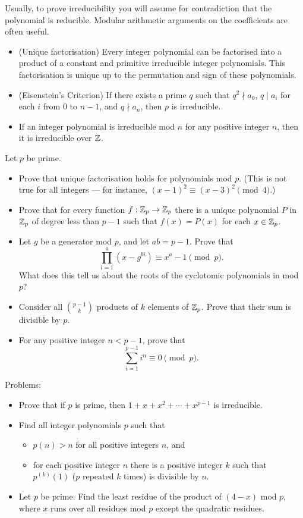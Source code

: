 Usually, to prove irreducibility you will assume for contradiction that the
polynomial is reducible. Modular arithmetic arguments on the coefficients are
often useful.
\begin{itemize}
  \item (Unique factorisation) Every integer polynomial can be factorised into a
    product of a constant and primitive irreducible integer
    polynomials. This factorisation is unique up to the permutation and sign of
    these polynomials.
  \item (Eisenstein's Criterion) If there exists a prime $q$ such that $q^2\nmid
    a_0$, $q\mid a_i$ for each $i$ from $0$ to $n-1$, and $q\nmid a_n$, then $p$
    is irreducible.
  \item If an integer polynomial is irreducible mod $n$ for any positive integer $n$,
      then it is irreducible over $\mathbb{Z}$.
\end{itemize}
Let $p$ be prime.
\begin{itemize}
  \item Prove that unique factorisation holds for polynomials mod $p$. (This is
    not true for all integers --- for instance,
    $(x-1)^2\equiv(x-3)^2\pmod 4$.)
  \item Prove that for every function $f:\mathbb{Z}_p\to\mathbb{Z}_p$ there is a unique polynomial $P$ in
    $\mathbb{Z}_p$ of degree less than $p-1$ such that $f(x)=P(x)$ for each
    $x\in\mathbb{Z}_p$.
  \item Let $g$ be a generator mod $p$, and let $ab=p-1$. Prove that
    \[\prod_{i=1}^a (x-g^{bi})\equiv x^a-1\pmod p.\]
    What does this tell us about the roots of the cyclotomic polynomials in mod
    $p$?
  \item Consider all $\binom{p-1}k$ products of $k$ elements of $\mathbb{Z}_p$. Prove
    that their sum is divisible by $p$.
  \item For any positive integer $n<p-1$, prove that
    \[\sum_{i=1}^{p-1} i^n\equiv 0\pmod p.\]
\end{itemize}
Problems:
\begin{itemize}
  \item Prove that if $p$ is prime, then $1+x+x^2+\cdots+x^{p-1}$ is
    irreducible.
  \item Find all integer polynomials $p$ such that
    \begin{itemize}
      \item $p(n)>n$ for all positive integers $n$, and
      \item for each positive integer $n$ there is a positive integer $k$ such
        that $p^{(k)}(1)$ ($p$ repeated $k$ times) is divisible by $n$.
    \end{itemize}
  \item Let $p$ be prime. Find the least residue of the product of $(4-x)$ mod $p$, where $x$ runs
    over all residues mod $p$ except the quadratic residues.
\end{itemize}
